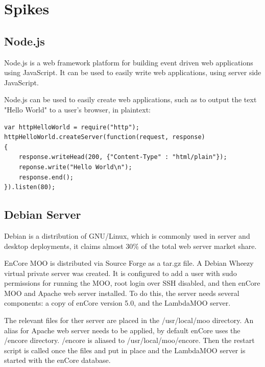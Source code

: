 \documentclass[12pt, letterpaper]{report}
\begin{document}
\chapter{Spikes}
\section{Node.js}



\par
Node.js is a web framework platform for building event driven web applications using JavaScript. It can be used to easily write web applications, using server side JavaScript.
	
\par
Node.js can be used to easily create web applications, such as to output the text "Hello World" to a user's browser, in plaintext:

\begin{lstlisting}
var httpHelloWorld = require("http");
httpHelloWorld.createServer(function(request, response)
{
    response.writeHead(200, {"Content-Type" : "html/plain"});
    reponse.write("Hello World\n");
    response.end();
}).listen(80);
\end{lstlisting}


\section{Debian Server}
\par
Debian is a distribution of GNU/Linux, which is commonly used in server and desktop deployments, it claims almost 30\% of the total web server market share.

\par 
EnCore MOO is distributed via Source Forge as a tar.gz file. A Debian Wheezy virtual private server was created. It is configured to add a user with sudo permissions for running the MOO, root login over SSH disabled, and then enCore MOO and Apache web server installed. To do this, the server needs several components: a copy of enCore version 5.0, and the LambdaMOO server.

\par
The relevant files for ther server are placed in the /usr/local/moo directory. An alias for Apache web server needs to be applied, by default enCore uses the /encore directory. /encore is aliased to /usr/local/moo/encore. Then the restart script is called once the files and put in place and the LambdaMOO server is started with the enCore database.
	
\end{document}
